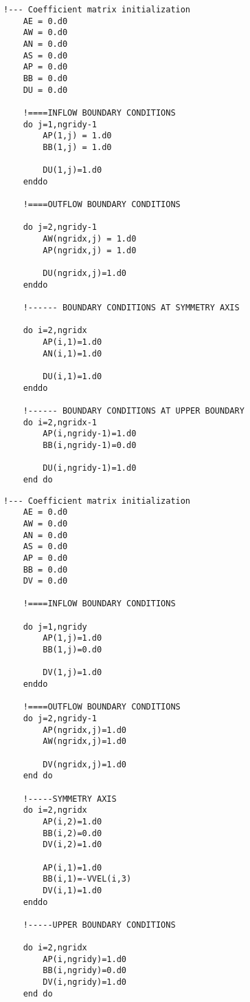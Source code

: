 \begin{lstlisting}[caption=\textrm{Οριακές συνθήκες ταχύτητας u}, label={lst:ubc}, mathescape=true, breaklines=true, linewidth=.6\textwidth]
    !--- Coefficient matrix initialization
    AE = 0.d0
    AW = 0.d0
    AN = 0.d0
    AS = 0.d0
    AP = 0.d0
    BB = 0.d0
    DU = 0.d0

    !====INFLOW BOUNDARY CONDITIONS                        
    do j=1,ngridy-1
        AP(1,j) = 1.d0
        BB(1,j) = 1.d0
        
        DU(1,j)=1.d0
    enddo

    !====OUTFLOW BOUNDARY CONDITIONS                        

    do j=2,ngridy-1
        AW(ngridx,j) = 1.d0
        AP(ngridx,j) = 1.d0

        DU(ngridx,j)=1.d0      
    enddo

    !------ BOUNDARY CONDITIONS AT SYMMETRY AXIS   

    do i=2,ngridx
        AP(i,1)=1.d0
        AN(i,1)=1.d0
        
        DU(i,1)=1.d0     
    enddo

    !------ BOUNDARY CONDITIONS AT UPPER BOUNDARY  
    do i=2,ngridx-1
        AP(i,ngridy-1)=1.d0
        BB(i,ngridy-1)=0.d0
        
        DU(i,ngridy-1)=1.d0
    end do  
\end{lstlisting}

\begin{lstlisting}[caption=\textrm{Οριακές συνθήκες ταχύτητας v}, label={lst:vbc}, mathescape=true, breaklines=true, linewidth=.6\textwidth]
    !--- Coefficient matrix initialization
    AE = 0.d0
    AW = 0.d0
    AN = 0.d0
    AS = 0.d0
    AP = 0.d0
    BB = 0.d0
    DV = 0.d0

    !====INFLOW BOUNDARY CONDITIONS     
    
    do j=1,ngridy
        AP(1,j)=1.d0
        BB(1,j)=0.d0

        DV(1,j)=1.d0    
    enddo

    !====OUTFLOW BOUNDARY CONDITIONS          
    do j=2,ngridy-1
        AP(ngridx,j)=1.d0
        AW(ngridx,j)=1.d0

        DV(ngridx,j)=1.d0    
    end do

    !-----SYMMETRY AXIS                
    do i=2,ngridx
        AP(i,2)=1.d0
        BB(i,2)=0.d0
        DV(i,2)=1.d0    
        
        AP(i,1)=1.d0
        BB(i,1)=-VVEL(i,3)
        DV(i,1)=1.d0
    enddo

    !-----UPPER BOUNDARY CONDITIONS 

    do i=2,ngridx
        AP(i,ngridy)=1.d0
        BB(i,ngridy)=0.d0
        DV(i,ngridy)=1.d0
    end do
\end{lstlisting}

